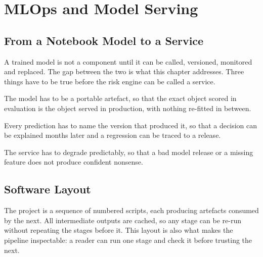 \documentclass[10pt,openany]{report}
\begin{document}
\chapter{MLOps and Model Serving}
\label{ch:mlops}

\section{From a Notebook Model to a Service}

A trained model is not a component until it can be called, versioned, monitored and replaced. The
gap between the two is what this chapter addresses. Three things have to be true before the risk
engine can be called a service.

The model has to be a portable artefact, so that the exact object scored in evaluation is the
object served in production, with nothing re-fitted in between.

Every prediction has to name the version that produced it, so that a decision can be explained
months later and a regression can be traced to a release.

The service has to degrade predictably, so that a bad model release or a missing feature does not
produce confident nonsense.

\section{Software Layout}

The project is a sequence of numbered scripts, each producing artefacts consumed by the next. All
intermediate outputs are cached, so any stage can be re-run without repeating the stages before it.
This layout is also what makes the pipeline inspectable: a reader can run one stage and check it
before trusting the next.
\end{document}
